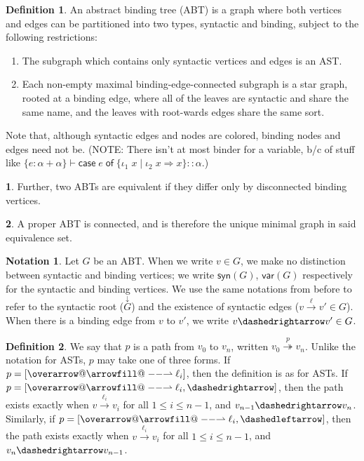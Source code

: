 \documentclass[11pt]{article} %
\makeatletter
\theoremstyle{definition}
\newtheorem{dfn}{Definition}
\newtheorem{subdfn}{\indent}[dfn]
\newtheorem*{ntn}{Notation}
\def\rightharpoonupfill@{\arrowfill@\relbar\relbar\rightharpoonup}
\newcommand{\harpvec}{%
   \mathpalette{\overarrow@\rightharpoonupfill@}}
\makeatother
\begin{document}
\begin{dfn}
\label{def:abt}
An abstract binding tree (ABT) is a graph where both vertices and edges can be partitioned into two types, syntactic and binding, subject to the following restrictions:
\begin{enumerate}[label=\alph*)]
\item The subgraph which contains only syntactic vertices and edges is an AST.
\item Each non-empty maximal binding-edge-connected subgraph is a star graph,
        rooted at a binding edge,
        where all of the leaves are syntactic and share the same name, and
        the leaves with root-wards edges share the same sort.
\end{enumerate}
Note that, although syntactic edges and nodes are colored, binding nodes and edges need not be.
(NOTE: There isn't at most binder for a variable, b/c of stuff like $\{e:\alpha + \alpha\} \vdash \mathsf{case}\;e\;\mathsf{of}\;\{\iota_1\;x \mid \iota_2\;x \Rightarrow x\}:: \alpha$.)
\begin{subdfn}
Further, two ABTs are equivalent if they differ only by disconnected binding vertices.
\end{subdfn}
\begin{subdfn}
A proper ABT is connected, and is therefore the unique minimal graph in said equivalence set.
\end{subdfn}
\end{dfn}

\begin{ntn}
Let $G$ be an ABT.
When we write $v \in G$, we make no distinction between syntactic and binding vertices; we write $\mathsf{syn}(G)$, $\mathsf{var}(G)$ respectively for the syntactic and binding vertices.
We use the same notations from before to refer to the syntactic root ($\overset{\downarrow}G$) and the existence of syntactic edges ($v \overset{\ell}\to v' \in G$).
When there is a binding edge from $v$ to $v'$, we write $v \dashedrightarrow v' \in G$.
\end{ntn}

\begin{dfn}
We say that $p$ is a path from $v_0$ to $v_n$, written $v_0 \overset{p}\twoheadrightarrow v_n$.
Unlike the notation for ASTs, $p$ may take one of three forms.
If $p = [\harpvec{\ell_i}]$, then the definition is as for ASTs.
If $p = [\harpvec{\ell_i},{\dashedrightarrow}]$, then the path exists exactly when $v \overset{\ell_i}\to v_i$ for all $1 \leq i \leq n-1$, and $v_{n-1} \dashedrightarrow v_n$.
Similarly, if $p = [\harpvec{\ell_i},{\dashedleftarrow}]$, then the path exists exactly when $v \overset{\ell_i}\to v_i$ for all $1 \leq i \leq n-1$, and $v_n \dashedrightarrow v_{n-1}$.
\end{dfn}
\end{document}
